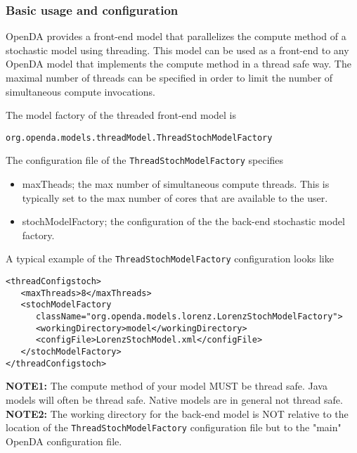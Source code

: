 \documentclass[12pt]{article}
\begin{document}
\subsubsection{Basic usage and configuration}
OpenDA provides a front-end model that parallelizes the compute method of a stochastic model using threading. This model can be used as a front-end to any OpenDA model that implements the compute method in a thread safe way. The maximal number of threads can be specified in order to limit the number of simultaneous compute invocations.
 
The model factory of the threaded front-end model is
\begin{verbatim}
org.openda.models.threadModel.ThreadStochModelFactory
\end{verbatim}

The configuration file of the {\tt ThreadStochModelFactory} specifies
\begin{itemize}
\item maxTheads; the max number of simultaneous compute threads. This is typically set to the
          max number of cores that are available to the user.
\item stochModelFactory; the configuration of the the back-end stochastic model factory.
\end{itemize}

A typical example of the {\tt ThreadStochModelFactory} configuration looks like 
{\small
\begin{verbatim}
<threadConfigstoch>
   <maxThreads>8</maxThreads>
   <stochModelFactory 
      className="org.openda.models.lorenz.LorenzStochModelFactory">
      <workingDirectory>model</workingDirectory>
      <configFile>LorenzStochModel.xml</configFile>
   </stochModelFactory>
</threadConfigstoch>
\end{verbatim}
}

{\bf NOTE1:} The compute method of your model MUST be thread safe. Java models will often be thread safe. Native models are in general not thread safe.\\

{\bf NOTE2:} The working directory for the back-end model is NOT relative to the location of the  {\tt ThreadStochModelFactory} configuration file but to the "main" OpenDA configuration file. 
\end{document}
